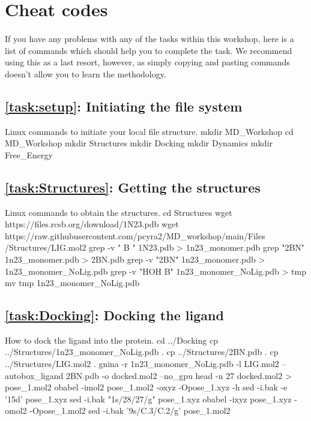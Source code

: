 \newpage
\section{Cheat codes}\label{sec:Cheats}
    \paragraph{}
    If you have any problems with any of the tasks within this workshop, here is a list of commands which should help you to complete the task. We recommend using this as a last resort, however,
    as simply copying and pasting commands doesn't allow you to learn the methodology. 

    \subsection{\cref{task:setup}: Initiating the file system}
    \begin{bashcmd}[label=cmd:task1]{Linux commands to initiate your local file structure.}
    mkdir MD_Workshop
    cd MD_Workshop
    mkdir Structures
    mkdir Docking
    mkdir Dynamics
    mkdir Free_Energy
    \end{bashcmd}
    
    \subsection{\cref{task:Structures}: Getting the structures}
    \begin{bashcmd}[label=cmd:task2]{Linux commands to obtain the structures.}
    cd Structures
    wget https://files.rcsb.org/download/1N23.pdb
    wget https://raw.githubusercontent.com/pcyra2/MD_workshop/main/Files /Structures/LIG.mol2
    grep -v " B " 1N23.pdb > 1n23_monomer.pdb
    grep "2BN" 1n23_monomer.pdb > 2BN.pdb
    grep -v "2BN" 1n23_monomer.pdb > 1n23_monomer_NoLig.pdb  
    grep -v "HOH B" 1n23_monomer_NoLig.pdb > tmp
    mv tmp 1n23_monomer_NoLig.pdb
    \end{bashcmd}

    \subsection{\cref{task:Docking}: Docking the ligand}
    \begin{bashcmd}[label=cmd:task3]{How to dock the ligand into the protein.}
    cd ../Docking
    cp ../Structures/1n23_monomer_NoLig.pdb .
    cp ../Structures/2BN.pdb .
    cp ../Structures/LIG.mol2 .
    gnina -r 1n23_monomer_NoLig.pdb -l LIG.mol2 --autobox_ligand 2BN.pdb -o docked.mol2 --no_gpu
    head -n 27 docked.mol2 > pose_1.mol2
    obabel -imol2 pose_1.mol2 -oxyz -Opose_1.xyz -h
    sed -i.bak -e '15d' pose_1.xyz 
    sed -i.bak "1s/28/27/g" pose_1.xyz
    obabel -ixyz pose_1.xyz -omol2 -Opose_1.mol2
    sed -i.bak '9s/C.3/C.2/g' pose_1.mol2
    \end{bashcmd}

